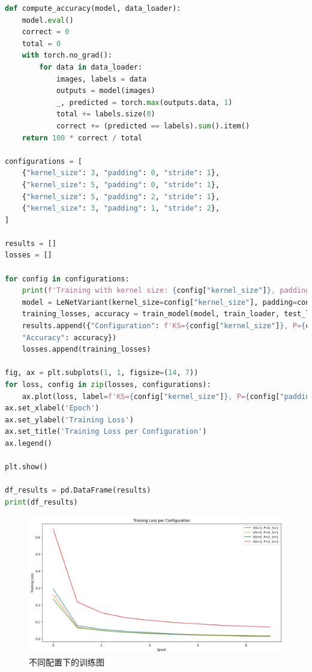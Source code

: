 \documentclass[a4paper,12pt]{article}
\begin{document}
\begin{lstlisting}[language=Python]
def compute_accuracy(model, data_loader):
	model.eval()
	correct = 0
	total = 0
	with torch.no_grad():
		for data in data_loader:
			images, labels = data
			outputs = model(images)
			_, predicted = torch.max(outputs.data, 1)
			total += labels.size(0)
			correct += (predicted == labels).sum().item()
	return 100 * correct / total

configurations = [
	{"kernel_size": 3, "padding": 0, "stride": 1},
	{"kernel_size": 5, "padding": 0, "stride": 1},
	{"kernel_size": 5, "padding": 2, "stride": 1},
	{"kernel_size": 3, "padding": 1, "stride": 2},
]

results = []
losses = []

for config in configurations:
	print(f'Training with kernel size: {config["kernel_size"]}, padding: {config["padding"]}, stride: {config["stride"]}')
	model = LeNetVariant(kernel_size=config["kernel_size"], padding=config["padding"], stride=config["stride"])
	training_losses, accuracy = train_model(model, train_loader, test_loader)
	results.append({"Configuration": f'KS={config["kernel_size"]}, P={config["padding"]}, S={config["stride"]}',
	"Accuracy": accuracy})
	losses.append(training_losses)

fig, ax = plt.subplots(1, 1, figsize=(14, 7))
for loss, config in zip(losses, configurations):
	ax.plot(loss, label=f'KS={config["kernel_size"]}, P={config["padding"]}, S={config["stride"]}')
ax.set_xlabel('Epoch')
ax.set_ylabel('Training Loss')
ax.set_title('Training Loss per Configuration')
ax.legend()

plt.show()

df_results = pd.DataFrame(results)
print(df_results)
\end{lstlisting}

\begin{figure}[htbp]
	\centering
	\includegraphics[width=1\textwidth]{17.png}
	\caption{不同配置下的训练图}
\end{figure}
\end{document}
